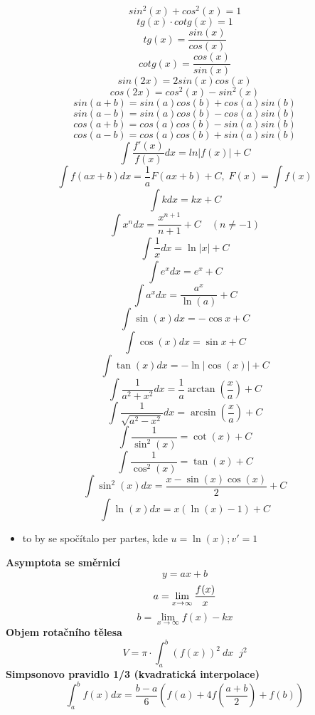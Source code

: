 \documentclass[8pt, a5paper]{extarticle}
\date{\vspace{-5ex}}
\begin{document}
  \begin{multicols}{2}

    \[
      sin^2(x) + cos^2(x) = 1
    \]
    \[
      tg(x) \cdot cotg(x) = 1
    \]
    \[
      tg(x) = \frac{sin(x)}{cos(x)}
    \]
    \[
      cotg(x) = \frac{cos(x)}{sin(x)}
    \]
    \[
      sin(2x) = 2sin(x)cos(x)
    \]
    \[
      cos(2x) = cos^2(x)-sin^2(x)
    \]
    \[
      sin(a + b) = sin(a)cos(b) + cos(a)sin(b)
    \]
    \[
      sin(a - b) = sin(a)cos(b) - cos(a)sin(b)
    \]
    \[
      cos(a + b) = cos(a)cos(b) - sin(a)sin(b)
    \]
    \[
      cos(a - b) = cos(a)cos(b) + sin(a)sin(b)
    \]
    \[
      \int \frac{f'(x)}{f(x)}dx = ln \left| f(x) \right| + C
    \]
    \[ \int f(ax + b)dx = \frac{1}{a} F(ax + b) + C, \; F(x) = \int f(x)\]
    \[
      \int k dx = kx + C
    \]
    \[
      \int x^n dx = \frac{x^{n+1}}{n+1} + C \quad (n \neq -1)
    \]
    \[
      \int \frac{1}{x} dx = \ln|x| + C
    \]
    \[
      \int e^x dx = e^x + C
    \]
    \[
      \int a^x dx = \frac{a^x}{\ln(a)} + C
    \]
    \[
      \int \sin (x) dx = -\cos x + C
    \]
    \[
      \int \cos (x) dx = \sin x + C
    \]
    \[
      \int \tan (x) dx = -\ln|\cos(x)| + C
    \]
    \[
      \int \frac{1}{a^2+x^2}dx = \frac{1}{a} \arctan\left(\frac{x}{a}\right) + C
    \]
    \[
      \int \frac{1}{\sqrt{a^2-x^2}}dx = \arcsin\left(\frac{x}{a}\right) + C
    \]
    \[
      \int \frac{1}{\sin^2(x)} = \cot(x) + C
    \]
    \[
      \int \frac{1}{\cos^2(x)} = \tan(x) + C
    \]
    \[
      \int \sin^2(x) dx = \frac{x - \sin(x)\cos(x)}{2} + C
    \]
    \[\int \ln(x) dx = x(\ln(x)-1) + C\]
    \begin{itemize}
      \item to by se spočítalo per partes, kde $u=\ln(x); v' = 1$
    \end{itemize}
  \end{multicols}
  \textbf{Asymptota se směrnicí}
  \[
    y = ax + b
  \]
  \[
    a=\lim_{x\to\infty} \frac{f(x)}{x} \\
  \]
  \[
    b=\lim_{x\to\infty} f(x)-kx
  \]
  \textbf{Objem rotačního tělesa}
  \[
    V = \pi \cdot \int_{a}^{b}(f(x))^2 \: dx \;\; j^2
  \]
  \textbf{Simpsonovo pravidlo 1/3 (kvadratická interpolace)}
  \[
    \int_{a}^{b} f(x)dx = \frac{b-a}{6} \left( f(a) + 4f\left(\frac{a+b}{2}\right) + f\left(b\right) \right)
  \]
\end{document}
